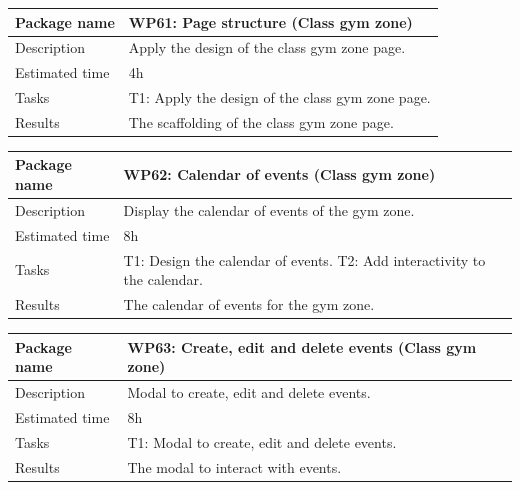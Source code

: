 \documentclass[a4paper, 12pt, oneside]{book}
\begin{document}
\vspace*{16pt}
\begin{tabularx}{\textwidth}{| l | X |}
	\hline
	\rowcolor{rowColor}
	{\semibf Package name}   & {\semibf WP61}: Page structure (Class gym zone)            \\
	\hline
	{\semibf Description}    & Apply the design of the class gym zone page.               \\
	\hline
	\rowcolor{rowColor}
	{\semibf Estimated time} & 4h                                                         \\
	\hline
	{\semibf Tasks}          & {\semibf T1}: Apply the design of the class gym zone page. \\
	\hline
	\rowcolor{rowColor}
	{\semibf Results}        & The scaffolding of the class gym zone page.                \\
	\hline
\end{tabularx}
\vspace*{16pt}
\begin{tabularx}{\textwidth}{| l | X |}
	\hline
	\rowcolor{rowColor}
	{\semibf Package name}   & {\semibf WP62}: Calendar of events (Class gym zone) \\
	\hline
	{\semibf Description}    & Display the calendar of events of the gym zone.     \\
	\hline
	\rowcolor{rowColor}
	{\semibf Estimated time} & 8h                                                  \\
	\hline
	{\semibf Tasks}          & {\semibf T1}: Design the calendar of events.
	{\semibf T2}: Add interactivity to the calendar.                               \\
	\hline
	\rowcolor{rowColor}
	{\semibf Results}        & The calendar of events for the gym zone.            \\
	\hline
\end{tabularx}
\vspace*{16pt}
\begin{tabularx}{\textwidth}{| l | X |}
	\hline
	\rowcolor{rowColor}
	{\semibf Package name}   & {\semibf WP63}: Create, edit and delete events (Class gym zone) \\
	\hline
	{\semibf Description}    & Modal to create, edit and delete events.                        \\
	\hline
	\rowcolor{rowColor}
	{\semibf Estimated time} & 8h                                                              \\
	\hline
	{\semibf Tasks}          & {\semibf T1}: Modal to create, edit and delete events.          \\
	\hline
	\rowcolor{rowColor}
	{\semibf Results}        & The modal to interact with events.                              \\
	\hline
\end{tabularx}
\end{document}
